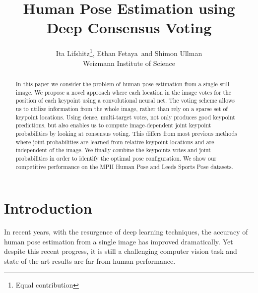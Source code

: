 \documentclass{article}
\title{Human Pose Estimation using Deep Consensus Voting}
\author{Ita Lifshitz\thanks{Equal contribution}, Ethan Fetaya\samethanks\, and Shimon Ullman \\
	Weizmann Institute of Science}
\date{}
\begin{document}
	\maketitle
	


\begin{abstract}
In this paper we consider the problem of human pose estimation from a single still image. We propose a novel approach where each location in the image votes for the position of each keypoint using a  convolutional neural net. The voting scheme allows us to utilize information from the whole image, rather than rely on a sparse set of keypoint locations. Using dense, multi-target votes,  not only produces good keypoint predictions, but also enables us to compute image-dependent joint keypoint probabilities by looking at consensus voting. This differs from most previous methods where joint probabilities are learned from relative keypoint locations and are independent of the image. We finally combine  the keypoints votes and joint probabilities in order to identify the optimal pose configuration. We show our competitive performance on the MPII Human Pose and Leeds Sports Pose datasets. \\

\end{abstract}


\section{Introduction} 
In recent years,  with the resurgence of deep learning techniques, the accuracy of human pose estimation from a single image has improved dramatically. Yet despite this recent progress, it  is still a challenging computer vision task and state-of-the-art results are far from human performance.\\
\end{document}
